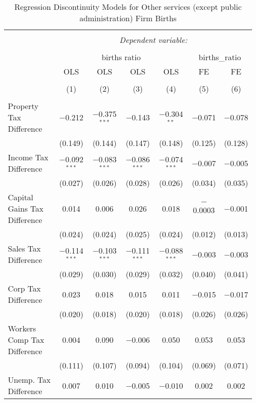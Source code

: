 
\begin{table}[!htbp] \centering 
  \caption{Regression Discontinuity Models for  Other services (except public administration) Firm Births} 
  \label{81rd} 
\begin{tabular}{@{\extracolsep{5pt}}lcccccc} 
\\[-1.8ex]\hline 
\hline \\[-1.8ex] 
 & \multicolumn{6}{c}{\textit{Dependent variable:}} \\ 
\cline{2-7} 
\\[-1.8ex] & \multicolumn{4}{c}{births ratio} & \multicolumn{2}{c}{births\_ratio} \\ 
 & OLS & OLS & OLS & OLS & FE & FE \\ 
\\[-1.8ex] & (1) & (2) & (3) & (4) & (5) & (6)\\ 
\hline \\[-1.8ex] 
 Property Tax Difference & $-$0.212 & $-$0.375$^{***}$ & $-$0.143 & $-$0.304$^{**}$ & $-$0.071 & $-$0.078 \\ 
  & (0.149) & (0.144) & (0.147) & (0.148) & (0.125) & (0.128) \\ 
  Income Tax Difference & $-$0.092$^{***}$ & $-$0.083$^{***}$ & $-$0.086$^{***}$ & $-$0.074$^{***}$ & $-$0.007 & $-$0.005 \\ 
  & (0.027) & (0.026) & (0.028) & (0.026) & (0.034) & (0.035) \\ 
  Capital Gains Tax Difference & 0.014 & 0.006 & 0.026 & 0.018 & $-$0.0003 & $-$0.001 \\ 
  & (0.024) & (0.024) & (0.025) & (0.024) & (0.012) & (0.013) \\ 
  Sales Tax Difference & $-$0.114$^{***}$ & $-$0.103$^{***}$ & $-$0.111$^{***}$ & $-$0.088$^{***}$ & $-$0.003 & $-$0.003 \\ 
  & (0.029) & (0.030) & (0.029) & (0.032) & (0.040) & (0.041) \\ 
  Corp Tax Difference & 0.023 & 0.018 & 0.015 & 0.011 & $-$0.015 & $-$0.017 \\ 
  & (0.020) & (0.018) & (0.020) & (0.018) & (0.026) & (0.026) \\ 
  Workers Comp Tax Difference & 0.004 & 0.090 & $-$0.006 & 0.050 & 0.053 & 0.053 \\ 
  & (0.111) & (0.107) & (0.094) & (0.104) & (0.069) & (0.071) \\ 
  Unemp. Tax Difference & 0.007 & 0.010 & $-$0.005 & $-$0.010 & 0.002 & 0.002 \\ 

\end{tabular}
\end{table}
